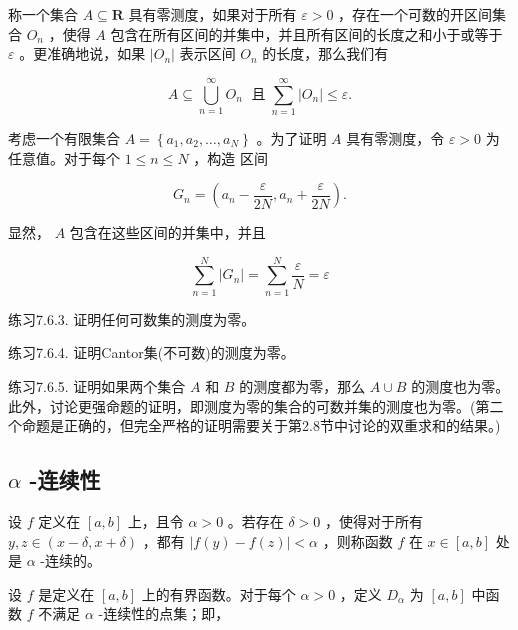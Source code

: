 \begin{Def}
  \label{def:7.6.1}
  称一个集合 \(A \subseteq  \mathbf{R}\) 具有零测度，如果对于所有 \(\varepsilon  > 0\) ，存在一个可数的开区间集合 \({O}_{n}\) ，使得 \(A\) 包含在所有区间的并集中，并且所有区间的长度之和小于或等于 \(\varepsilon\) 。更准确地说，如果 \(\left| {O}_{n}\right|\) 表示区间 \({O}_{n}\) 的长度，那么我们有

\[
A \subseteq  \mathop{\bigcup }\limits_{{n = 1}}^{\infty }{O}_{n}\;\text{ 且}\;\mathop{\sum }\limits_{{n = 1}}^{\infty }\left| {O}_{n}\right|  \leq  \varepsilon .
\]
\end{Def}

\begin{Eg}
考虑一个有限集合 \(A = \left\{  {{a}_{1},{a}_{2},\ldots ,{a}_{N}}\right\}\) 。为了证明 \(A\) 具有零测度，令 \(\varepsilon  > 0\) 为任意值。对于每个 \(1 \leq  n \leq  N\) ，构造
区间

\[
{G}_{n} = \left( {{a}_{n} - \frac{\varepsilon }{2N},{a}_{n} + \frac{\varepsilon }{2N}}\right) .
\]

显然， \(A\) 包含在这些区间的并集中，并且

\[
\mathop{\sum }\limits_{{n = 1}}^{N}\left| {G}_{n}\right|  = \mathop{\sum }\limits_{{n = 1}}^{N}\frac{\varepsilon }{N} = \varepsilon
\]  
\end{Eg}


练习7.6.3. 证明任何可数集的测度为零。

练习7.6.4. 证明Cantor集(不可数)的测度为零。

练习7.6.5. 证明如果两个集合 \(A\) 和 \(B\) 的测度都为零，那么 \(A \cup  B\) 的测度也为零。此外，讨论更强命题的证明，即测度为零的集合的可数并集的测度也为零。(第二个命题是正确的，但完全严格的证明需要关于第2.8节中讨论的双重求和的结果。)

\subsection{\(\alpha\) -连续性}
\begin{Def}
  \label{def:7.6.3}
  设 \(f\) 定义在 \(\left\lbrack  {a,b}\right\rbrack\) 上，且令 \(\alpha  > 0\) 。若存在 \(\delta  > 0\) ，使得对于所有 \(y,z \in  \left( {x - \delta ,x + \delta }\right)\) ，都有 \(\left| {f\left( y\right)  - f\left( z\right) }\right|  < \alpha\) ，则称函数 \(f\) 在 \(x \in  \left\lbrack  {a,b}\right\rbrack\) 处是 \(\alpha\) -连续的。

\end{Def}


  设 \(f\) 是定义在 \(\left\lbrack  {a,b}\right\rbrack\) 上的有界函数。对于每个 \(\alpha  > 0\) ，定义 \({D}_{\alpha }\) 为 \(\left\lbrack  {a,b}\right\rbrack\) 中函数 \(f\) 不满足 \(\alpha\) -连续性的点集；即，

